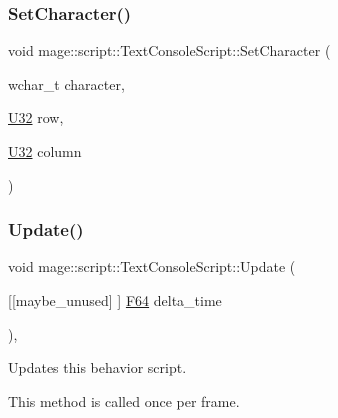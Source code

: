 \hypertarget{classmage_1_1script_1_1_text_console_script_a18bdee79ee6f53e28f90b607c36c8188}{}\label{classmage_1_1script_1_1_text_console_script_a18bdee79ee6f53e28f90b607c36c8188} 
\subsubsection{\texorpdfstring{Set\+Character()}{SetCharacter()}}
{\footnotesize\ttfamily void mage\+::script\+::\+Text\+Console\+Script\+::\+Set\+Character (\begin{DoxyParamCaption}\item[{wchar\+\_\+t}]{character,  }\item[{\hyperlink{namespacemage_a41c104c036fba3756a74e19f793eeaa1}{U32}}]{row,  }\item[{\hyperlink{namespacemage_a41c104c036fba3756a74e19f793eeaa1}{U32}}]{column }\end{DoxyParamCaption})\hspace{0.3cm}{\ttfamily [private]}}

\hypertarget{classmage_1_1script_1_1_text_console_script_afc3d3099761c9c96b1a87ca07f06ddec}{}\label{classmage_1_1script_1_1_text_console_script_afc3d3099761c9c96b1a87ca07f06ddec} 
\subsubsection{\texorpdfstring{Update()}{Update()}}
{\footnotesize\ttfamily void mage\+::script\+::\+Text\+Console\+Script\+::\+Update (\begin{DoxyParamCaption}\item[{\mbox{[}\mbox{[}maybe\+\_\+unused\mbox{]} \mbox{]} \hyperlink{namespacemage_ad26233bbec640deda836e572c1a23708}{F64}}]{delta\+\_\+time }\end{DoxyParamCaption})\hspace{0.3cm}{\ttfamily [override]}, {\ttfamily [virtual]}}

Updates this behavior script.

This method is called once per frame.


